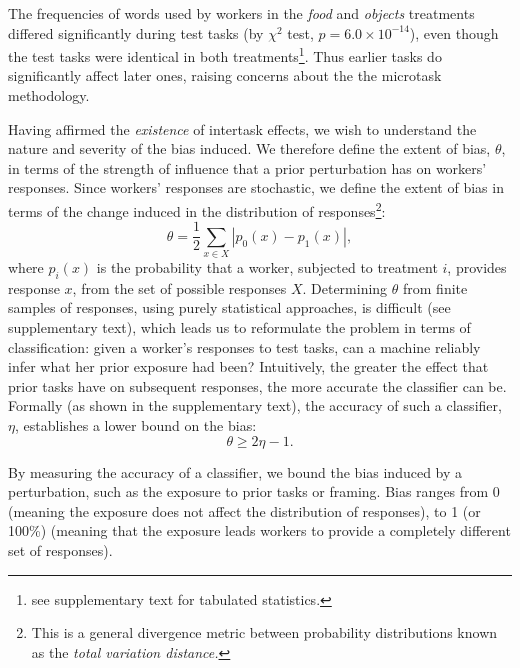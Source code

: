 \documentclass[12pt]{article}
\begin{document}
The frequencies of words used by
workers in the \textit{food} and \textit{objects} treatments differed
significantly during test tasks (by $\chi^2$ test, $p = 6.0 \times 10^{-14}$),
even though the test tasks were identical in both treatments\footnote{
	see supplementary text for tabulated statistics.
}.  Thus earlier tasks do significantly affect later ones, raising concerns 
about the the microtask methodology.

Having affirmed the \textit{existence} of intertask effects, we wish to
understand the nature and severity of the bias induced.
We therefore define the extent of bias, $\theta$, in terms of
the strength of influence that a prior perturbation has on workers' responses.
Since workers' responses are stochastic, we define the extent of bias in 
terms of the change induced in the distribution of responses\footnote{
	This is a general divergence metric between probability 
	distributions known as the \textit{total variation distance.}
}:
\begin{equation}
	\theta = \frac{1}{2}\sum_{x \in X} \left| p_0(x) - p_1(x) \right|,
	\label{eq:theta}
\end{equation}
where $p_i(x)$ is the probability that a worker, subjected to treatment $i$,
provides response $x$, from the set of possible responses $X$.
Determining $\theta$ from finite samples of responses, using purely 
statistical approaches, is difficult (see supplementary text),
which leads us to reformulate the
problem in terms of classification: given a worker's 
responses to test tasks, can a machine reliably infer what her prior exposure 
had been?  Intuitively, the greater the effect that prior tasks have on 
subsequent responses, the more accurate the classifier can be.  
Formally (as shown in the supplementary text), the accuracy of such a 
classifier, $\eta$, establishes a lower bound on the bias:
\begin{equation}
	\theta \geq 2\eta - 1.
	\label{l1}
\end{equation}

By measuring the accuracy of a classifier, we bound the 
bias induced by a perturbation, such as the exposure to prior tasks or 
framing.
Bias ranges from 0 (meaning the exposure 
does not affect the distribution of responses), to 1 
(or 100\%) (meaning that the exposure leads workers to provide a completely
different set of responses).
\end{document}
